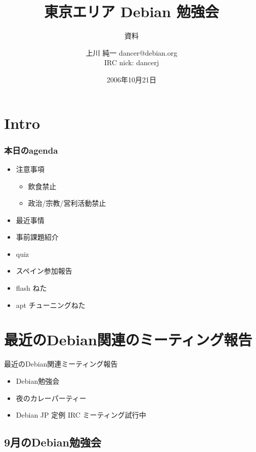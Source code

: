 \documentclass[cjk,dvipdfmx]{beamer}
\title{東京エリア Debian 勉強会}
\subtitle{資料}
\author{上川 純一 dancer@debian.org\\IRC nick: dancerj}
\date{2006年10月21日}
\begin{document}
\frame{\titlepage{}}

\section{Intro}

\begin{frame}
 \frametitle{本日のagenda}
\begin{minipage}[t]{0.4\hsize}
  \begin{itemize}
  \item 注意事項
	\begin{itemize}
	 \item 飲食禁止
	 \item 政治/宗教/営利活動禁止
	\end{itemize}
  \item 最近事情
  \item 事前課題紹介
  \item quiz
 \end{itemize}
\end{minipage} 
\begin{minipage}[t]{0.4\hsize}
\begin{itemize}
  \item スペイン参加報告
  \item flash ねた
  \item apt チューニングねた
 \end{itemize}
\end{minipage}
\end{frame}

\section{最近のDebian関連のミーティング報告}

\begin{frame}{最近のDebian関連ミーティング報告}
 \begin{itemize}
  \item Debian勉強会
  \item 夜のカレーパーティー
  \item Debian JP 定例 IRC ミーティング試行中\\
 \end{itemize}
\end{frame}

\subsection{9月のDebian勉強会}
\end{document}
